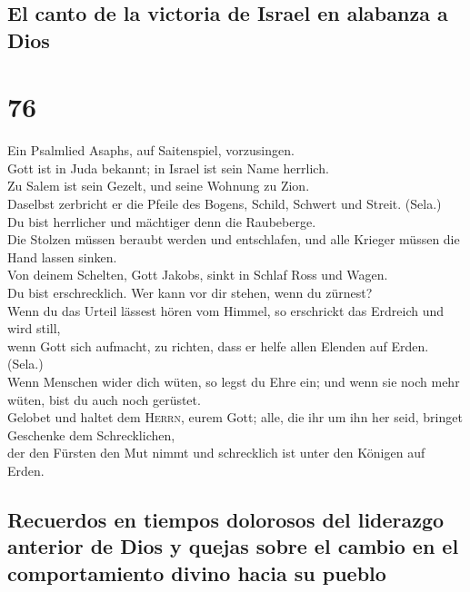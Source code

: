 \hypertarget{el-canto-de-la-victoria-de-israel-en-alabanza-a-dios}{%
\subsection{El canto de la victoria de Israel en alabanza a
Dios}\label{el-canto-de-la-victoria-de-israel-en-alabanza-a-dios}}

\hypertarget{section-75}{%
\section{76}\label{section-75}}

 Ein Psalmlied Asaphs, auf Saitenspiel, vorzusingen.\\
 Gott ist in Juda bekannt; in Israel ist sein Name
herrlich.\\
 Zu Salem ist sein Gezelt, und seine Wohnung zu Zion.\\
 Daselbst zerbricht er die Pfeile des Bogens, Schild,
Schwert und Streit. (Sela.)\\
 Du bist herrlicher und mächtiger denn die Raubeberge.\\
 Die Stolzen müssen beraubt werden und entschlafen, und
alle Krieger müssen die Hand lassen sinken.\\
 Von deinem Schelten, Gott Jakobs, sinkt in Schlaf Ross
und Wagen.\\
 Du bist erschrecklich. Wer kann vor dir stehen, wenn du
zürnest?\\
 Wenn du das Urteil lässest hören vom Himmel, so
erschrickt das Erdreich und wird still,\\
 wenn Gott sich aufmacht, zu richten, dass er helfe allen
Elenden auf Erden. (Sela.)\\
 Wenn Menschen wider dich wüten, so legst du Ehre ein;
und wenn sie noch mehr wüten, bist du auch noch gerüstet.\\
 Gelobet und haltet dem \textsc{Herrn}, eurem Gott; alle,
die ihr um ihn her seid, bringet Geschenke dem Schrecklichen,\\
 der den Fürsten den Mut nimmt und schrecklich ist unter
den Königen auf Erden.

\hypertarget{recuerdos-en-tiempos-dolorosos-del-liderazgo-anterior-de-dios-y-quejas-sobre-el-cambio-en-el-comportamiento-divino-hacia-su-pueblo}{%
\subsection{Recuerdos en tiempos dolorosos del liderazgo anterior de
Dios y quejas sobre el cambio en el comportamiento divino hacia su
pueblo}\label{recuerdos-en-tiempos-dolorosos-del-liderazgo-anterior-de-dios-y-quejas-sobre-el-cambio-en-el-comportamiento-divino-hacia-su-pueblo}}

